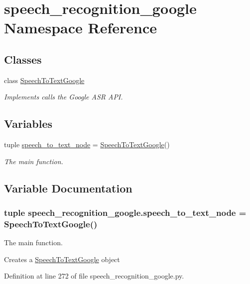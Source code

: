 \hypertarget{namespacespeech__recognition__google}{\section{speech\-\_\-recognition\-\_\-google Namespace Reference}
\label{namespacespeech__recognition__google}
}
\subsection*{Classes}
\begin{DoxyCompactItemize}
\item 
class \hyperlink{classspeech__recognition__google_1_1SpeechToTextGoogle}{Speech\-To\-Text\-Google}
\begin{DoxyCompactList}\small\item\em Implements calls the Google A\-S\-R A\-P\-I. \end{DoxyCompactList}\end{DoxyCompactItemize}
\subsection*{Variables}
\begin{DoxyCompactItemize}
\item 
tuple \hyperlink{namespacespeech__recognition__google_a72262ab039ae77c265a0575478792276}{speech\-\_\-to\-\_\-text\-\_\-node} = \hyperlink{classspeech__recognition__google_1_1SpeechToTextGoogle}{Speech\-To\-Text\-Google}()
\begin{DoxyCompactList}\small\item\em The main function. \end{DoxyCompactList}\end{DoxyCompactItemize}


\subsection{Variable Documentation}
\hypertarget{namespacespeech__recognition__google_a72262ab039ae77c265a0575478792276}{
\subsubsection[{speech\-\_\-to\-\_\-text\-\_\-node}]{\setlength{\rightskip}{0pt plus 5cm}tuple speech\-\_\-recognition\-\_\-google.\-speech\-\_\-to\-\_\-text\-\_\-node = {\bf Speech\-To\-Text\-Google}()}}\label{namespacespeech__recognition__google_a72262ab039ae77c265a0575478792276}


The main function. 

Creates a \hyperlink{classspeech__recognition__google_1_1SpeechToTextGoogle}{Speech\-To\-Text\-Google} object 

Definition at line 272 of file speech\-\_\-recognition\-\_\-google.\-py.

